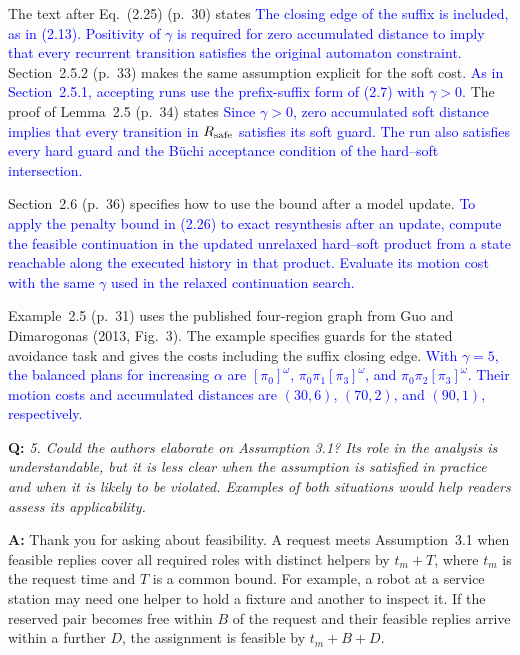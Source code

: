 \documentclass[11pt]{article}
\newcommand{\change}[1]{\textcolor{blue}{#1}}
\begin{document}
\begin{itemize}
The text after
Eq.~(2.25) (p.~30) states
\change{The closing edge of the suffix is included,
as in (2.13). Positivity of $\gamma$ is required for
zero accumulated distance to imply that every recurrent transition
satisfies the original automaton constraint.}
Section~2.5.2 (p.~33) makes the same assumption explicit for the soft cost.
\change{As in Section~2.5.1, accepting runs use the prefix-suffix form of (2.7)
with $\gamma>0$.} The proof of Lemma~2.5 (p.~34) states
\change{Since $\gamma>0$, zero accumulated soft distance implies that every
transition in $R_{\textup{safe}}$ satisfies its soft guard. The run also satisfies
every hard guard and the B\"uchi acceptance condition of the hard--soft
intersection.}

Section~2.6 (p.~36) specifies how to use the bound after a model update.
\change{To apply the penalty bound in (2.26) to exact resynthesis after an update,
compute the feasible continuation in the updated unrelaxed hard--soft product
from a state reachable along the executed history in that product. Evaluate its
motion cost with the same $\gamma$ used in the relaxed continuation search.}

Example~2.5 (p.~31) uses the published four-region graph from Guo and
Dimarogonas (2013, Fig.~3). The example specifies guards for the stated
avoidance task and gives the costs including the suffix closing edge.
\change{With $\gamma=5$, the balanced plans for increasing $\alpha$ are
$[\pi_0]^\omega$, $\pi_0\pi_1[\pi_3]^\omega$, and $\pi_0\pi_2[\pi_3]^\omega$.
Their motion costs and accumulated distances are $(30,6)$, $(70,2)$,
and $(90,1)$, respectively.}
\end{itemize}

\begin{shaded*}
\noindent\textbf{Q:} \emph{5. Could the authors elaborate on Assumption
3.1? Its role in the analysis is understandable, but it is less clear when the assumption
is satisfied in practice and when it is likely to be violated. Examples of both situations
would help readers assess its applicability.}
\end{shaded*}
\noindent\textbf{A:} Thank you for asking about feasibility. A request meets
Assumption~3.1 when feasible replies
cover all required roles with distinct helpers by $t_m+T$, where $t_m$ is the
request time and $T$ is a common bound. For example, a robot at a service station
may need one helper to hold a fixture and another to inspect it. If the reserved
pair becomes free within $B$ of the request and their feasible replies arrive
within a further $D$, the assignment is feasible by $t_m+B+D$.
\end{document}
